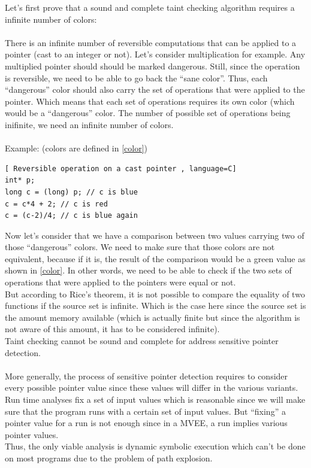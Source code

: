 \documentclass[english]{enstaPRE}
\begin{document}
Let's first prove that a sound and complete taint checking algorithm requires a infinite number of colors:\\ \\
There is an infinite number of reversible computations that can be applied to a pointer (cast to an integer or not). Let's consider multiplication for 
example. Any multiplied pointer should should be marked dangerous. Still, since the operation is reversible, we need to be able to go back the ``sane color''.
Thus, each ``dangerous'' color should also carry the set of operations that were applied to the pointer. Which means that each set of operations requires 
its own color (which would be a ``dangerous'' color. The number of possible set of operations being inifinite, we need an infinite number of colors.
\\ \\ 
Example: (colors are defined in \ref{color})

\begin{center}
 

\begin{lstlisting}[ Reversible operation on a cast pointer , language=C]
int* p;
long c = (long) p; // c is blue  
c = c*4 + 2; // c is red
c = (c-2)/4; // c is blue again

\end{lstlisting}\label{color}
\end{center}

Now let's consider that we have a comparison between two values carrying two of those ``dangerous'' colors. We need to make sure that those colors are not 
equivalent, because if it is, the result of the comparison would be a green value as shown in \ref{color}. In other words, we need to be able to check 
if the two sets of operations that were applied to the pointers were equal or not. \\
But according to Rice's theorem, it is not possible to compare the equality of two functions if the source set is infinite. Which is the case here since the 
source set is the amount memory available (which is actually finite but since the algorithm is not aware of this amount, it has to be considered infinite).
\\
Taint checking cannot be sound and complete for address sensitive pointer detection.
\\ \\
More generally, the process of sensitive pointer detection requires to consider every possible pointer value since these values will differ in the 
various variants. Run time analyses fix a set of input values which is reasonable since we will make sure that the program runs with a certain 
set of input values. But ``fixing'' a pointer value for a run is not enough since in a MVEE, a run implies various pointer values.
\\
Thus, the only viable analysis is dynamic symbolic execution \cite{dynamic} 
which can't be done on most programs due to the problem of path explosion.\\
 
\end{document}
